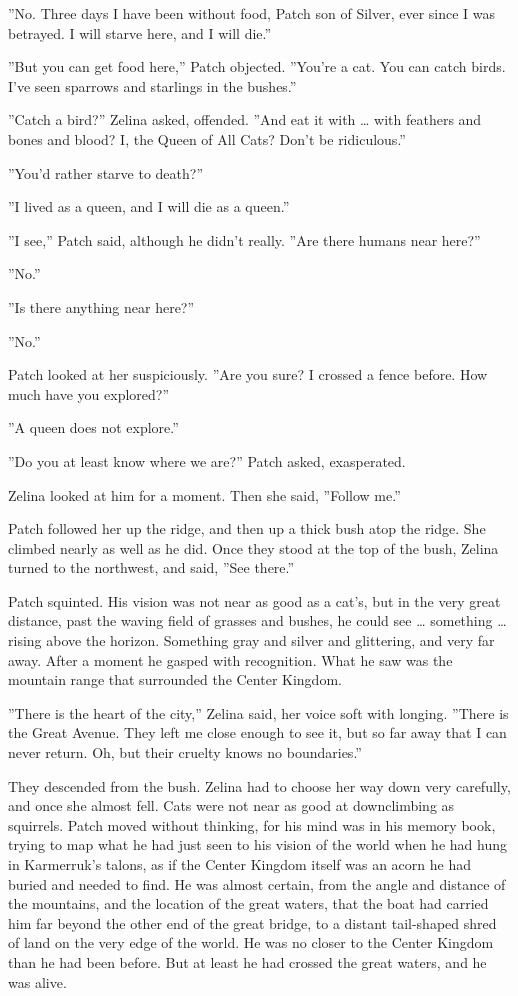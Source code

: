 \documentclass[12pt]{book}
\begin{document}
''No. Three days I have been without food, Patch son of Silver, ever
since I was betrayed. I will starve here, and I will die.''

''But you can get food here,'' Patch objected. ''You're a cat. You can
catch birds. I've seen sparrows and starlings in the bushes.''

''Catch a bird?'' Zelina asked, offended. ''And eat it with \ldots{}
with feathers and bones and blood? I, the Queen of All Cats? Don't be
ridiculous.''

''You'd rather starve to death?''

''I lived as a queen, and I will die as a queen.''

''I see,'' Patch said, although he didn't really. ''Are there humans
near here?''

''No.''

''Is there anything near here?''

''No.''

Patch looked at her suspiciously. ''Are you sure? I crossed a fence
before. How much have you explored?''

''A queen does not explore.''

''Do you at least know where we are?'' Patch asked, exasperated.

Zelina looked at him for a moment. Then she said, ''Follow me.''

Patch followed her up the ridge, and then up a thick bush atop the
ridge. She climbed nearly as well as he did. Once they stood at the
top of the bush, Zelina turned to the northwest, and said, ''See
there.''

Patch squinted. His vision was not near as good as a cat's, but in the
very great distance, past the waving field of grasses and bushes, he
could see \ldots{} something \ldots{} rising above the
horizon. Something gray and silver and glittering, and very far
away. After a moment he gasped with recognition. What he saw was the
mountain range that surrounded the Center Kingdom.

''There is the heart of the city,'' Zelina said, her voice soft with
longing. ''There is the Great Avenue. They left me close enough to see
it, but so far away that I can never return. Oh, but their cruelty
knows no boundaries.''

They descended from the bush. Zelina had to choose her way down very
carefully, and once she almost fell. Cats were not near as good at
downclimbing as squirrels. Patch moved without thinking, for his mind
was in his memory book, trying to map what he had just seen to his
vision of the world when he had hung in Karmerruk's talons, as if the
Center Kingdom itself was an acorn he had buried and needed to
find. He was almost certain, from the angle and distance of the
mountains, and the location of the great waters, that the boat had
carried him far beyond the other end of the great bridge, to a distant
tail-shaped shred of land on the very edge of the world. He was no
closer to the Center Kingdom than he had been before. But at least he
had crossed the great waters, and he was alive.
\end{document}
